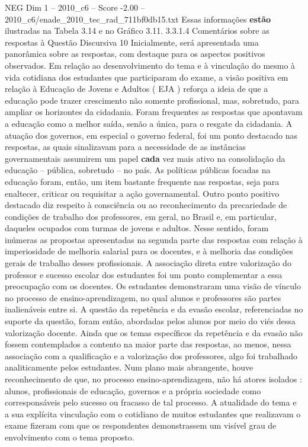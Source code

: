 \begin{textsample}{NEG Dim 1 – 2010\_c6 – Score -2.00 – 2010\_c6/enade\_2010\_tec\_rad\_711bf0db15.txt}
Essas informações \textbf{estão} ilustradas na Tabela 3.14 e no Gráfico 3.11. 3.3.1.4 Comentários sobre as respostas à Questão Discursiva 10 Inicialmente, será apresentada uma panorâmica sobre as respostas, com destaque para os aspectos positivos observados.
Em relação ao desenvolvimento do tema e à vinculação do mesmo à vida cotidiana dos estudantes que participaram do exame, a visão positiva em relação à Educação de Jovens e Adultos ( EJA ) reforça a ideia de que a educação pode trazer crescimento não somente profissional, mas, sobretudo, para ampliar os horizontes da cidadania.
Foram frequentes as respostas que apontavam a educação como a melhor saída, senão a única, para o resgate da cidadania.
A atuação dos governos, em especial o governo federal, foi um ponto destacado nas respostas, as quais sinalizavam para a necessidade de as instâncias governamentais assumirem um papel \textbf{cada} vez mais ativo na consolidação da educação – pública, sobretudo – no país.
As políticas públicas focadas na educação foram, então, um item bastante frequente nas respostas, seja para enaltecer, criticar ou requisitar a ação governamental.
Outro ponto positivo destacado diz respeito à consciência ou ao reconhecimento da precariedade de condições de trabalho dos professores, em geral, no Brasil e, em particular, daqueles ocupados com turmas de jovens e adultos.
Nesse sentido, foram inúmeras as propostas apresentadas na segunda parte das respostas com relação à imperiosidade de melhoria salarial para os docentes, e à melhoria das condições gerais de trabalho desses profissionais.
A associação direta entre valorização do professor e sucesso escolar dos estudantes foi um ponto complementar a essa preocupação com os docentes.
Os estudantes demonstraram uma visão de vínculo no processo de ensino-aprendizagem, no qual alunos e professores são partes inalienáveis entre si.
A questão da repetência e da evasão escolar, referenciadas no suporte da questão, foram então, abordadas pelos alunos por meio do viés dessa valorização docente.
Ainda que os temas específicos da repetência e da evasão não fossem contemplados a contento na maior parte das respostas, ao menos, nessa associação com a qualificação e a valorização dos professores, algo foi trabalhado analiticamente pelos estudantes.
Num plano mais abrangente, houve reconhecimento de que, no processo ensino-aprendizagem, não há atores isolados : alunos, profissionais de educação, governos e a própria sociedade como corresponsáveis pelo sucesso ou fracasso de tal processo.
A atualidade do tema e a sua explícita vinculação com o cotidiano de muitos estudantes que realizavam o exame fizeram com que os respondentes demonstrassem um visível grau de envolvimento com o tema proposto.

\end{textsample}
